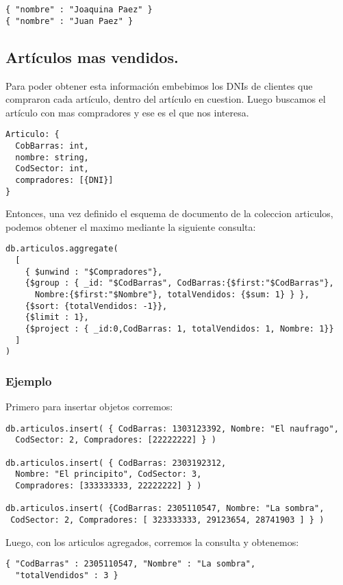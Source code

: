 \begin{lstlisting}
{ "nombre" : "Joaquina Paez" }
{ "nombre" : "Juan Paez" }
\end{lstlisting}

\subsection{Artículos mas vendidos.}
Para poder obtener esta información embebimos los DNIs de clientes que compraron cada artículo, dentro del artículo en cuestion. Luego buscamos el artículo con mas compradores y ese es el que nos interesa.

\begin{lstlisting}
Articulo: {
  CobBarras: int,
  nombre: string,
  CodSector: int,
  compradores: [{DNI}]
}
\end{lstlisting}


Entonces, una vez definido el esquema de documento de la coleccion articulos, podemos obtener el maximo mediante la siguiente consulta:
\begin{lstlisting}
db.articulos.aggregate(
  [
    { $unwind : "$Compradores"},
    {$group : { _id: "$CodBarras", CodBarras:{$first:"$CodBarras"},
      Nombre:{$first:"$Nombre"}, totalVendidos: {$sum: 1} } },
    {$sort: {totalVendidos: -1}},
    {$limit : 1},
    {$project : { _id:0,CodBarras: 1, totalVendidos: 1, Nombre: 1}}
  ]
)
\end{lstlisting}

\subsubsection{Ejemplo}
Primero para insertar objetos corremos:
\begin{lstlisting}
db.articulos.insert( { CodBarras: 1303123392, Nombre: "El naufrago",
  CodSector: 2, Compradores: [22222222] } )

db.articulos.insert( { CodBarras: 2303192312,
  Nombre: "El principito", CodSector: 3,
  Compradores: [333333333, 22222222] } )

db.articulos.insert( {CodBarras: 2305110547, Nombre: "La sombra",
 CodSector: 2, Compradores: [ 323333333, 29123654, 28741903 ] } )

\end{lstlisting}

Luego, con los articulos agregados, corremos la consulta y obtenemos:

\begin{lstlisting}
{ "CodBarras" : 2305110547, "Nombre" : "La sombra",
  "totalVendidos" : 3 }
\end{lstlisting}


